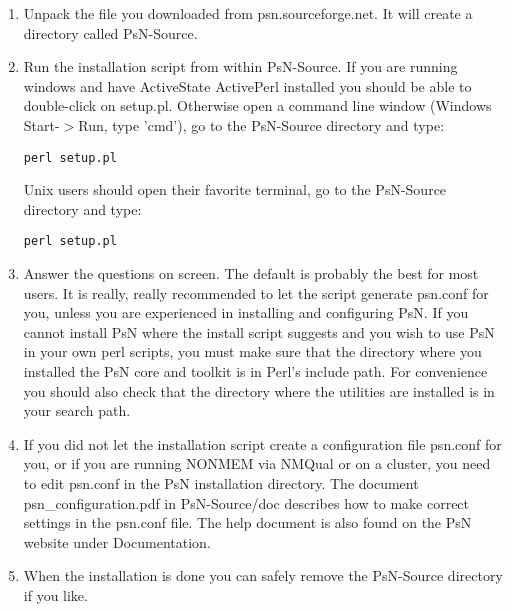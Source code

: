 \begin{enumerate}
\item Unpack the file you downloaded from psn.sourceforge.net. It will create a directory called PsN-Source.
\item Run the installation script from within PsN-Source. If you are running windows and have ActiveState ActivePerl installed you should be able to double-click on setup.pl. Otherwise open a command line window (Windows Start-$>$Run, type 'cmd'), go to the PsN-Source directory and type: 
\begin{verbatim}
perl setup.pl
\end{verbatim}
Unix users should open their favorite terminal, go to the PsN-Source directory and type:
\begin{verbatim}
perl setup.pl
\end{verbatim}
\item Answer the questions on screen. The default is probably the best for most users. It is really, really recommended to let the script generate psn.conf for you, unless you are experienced in installing and configuring PsN.
If you cannot install PsN where the install script suggests and you wish to use PsN in your own perl scripts, you must make sure that the directory where you installed the PsN core and toolkit is in Perl's include path. For convenience you should also check that the directory where the utilities are installed is in your search path. 
\item If you did not let the installation script create a configuration file psn.conf for you, or if you are running NONMEM via NMQual or on a cluster, you need to edit psn.conf in the PsN installation directory. The document psn\_configuration.pdf in PsN-Source/doc describes how to make correct settings in the psn.conf file. The help document is also found on the PsN website under Documentation.
\item When the installation is done you can safely remove the PsN-Source directory if you like. 
\end{enumerate}



